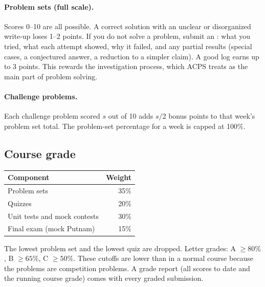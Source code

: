 \documentclass[11pt]{scrartcl}
\begin{document}
\paragraph{Problem sets (full scale).}
Scores 0--10 are all possible. A correct solution with an unclear or disorganized write-up loses
1--2 points. If you do not solve a problem, submit an : what you tried,
what each attempt showed, why it failed, and any partial results (special cases, a conjectured answer,
a reduction to a simpler claim). A good log earns up to 3 points.
This rewards the investigation process, which ACPS treats as the main part of problem solving.

\paragraph{Challenge problems.}
Each challenge problem scored $s$ out of 10 adds $s/2$ bonus points to that week's problem set total.
The problem-set percentage for a week is capped at 100\%.

\subsection{Course grade}
\begin{center}
\begin{tabular}{lr}
  \toprule
  \textbf{Component} & \textbf{Weight} \\
  \midrule
  Problem sets & 35\% \\
  Quizzes & 20\% \\
  Unit tests and mock contests & 30\% \\
  Final exam (mock Putnam) & 15\% \\
  \bottomrule
\end{tabular}
\end{center}
The lowest problem set and the lowest quiz are dropped.
Letter grades: A $\geq 80\%$, B $\geq 65\%$, C $\geq 50\%$.
These cutoffs are lower than in a normal course because the problems are competition problems.
A grade report (all scores to date and the running course grade) comes with every graded submission.
\end{document}
